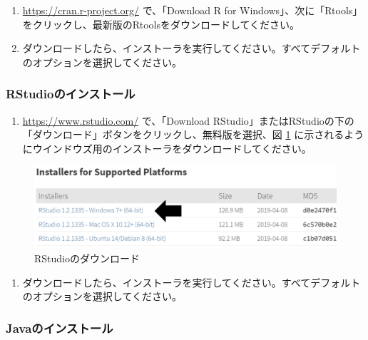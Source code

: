 \documentclass[
  11pt]{book}
\providecommand{\tightlist}{%
  \setlength{\itemsep}{0pt}\setlength{\parskip}{0pt}}
\theoremstyle{definition}
\theoremstyle{definition}
\theoremstyle{definition}
\theoremstyle{definition}
\theoremstyle{remark}
\begin{document}
\begin{enumerate}
\def\labelenumi{\arabic{enumi}.}
\item
  \url{https://cran.r-project.org/} で、「Download R for Windows」、次に「Rtools」をクリックし、最新版のRtoolsをダウンロードしてください。
\item
  ダウンロードしたら、インストーラを実行してください。すべてデフォルトのオプションを選択してください。
\end{enumerate}

\subsubsection*{RStudioのインストール}\label{rstudioux306eux30a4ux30f3ux30b9ux30c8ux30fcux30eb}

\begin{enumerate}
\def\labelenumi{\arabic{enumi}.}
\tightlist
\item
  \url{https://www.rstudio.com/} で、「Download RStudio」またはRStudioの下の「ダウンロード」ボタンをクリックし、無料版を選択、図 \ref{fig:downloadRStudio} に示されるようにウインドウズ用のインストーラをダウンロードしてください。
\end{enumerate}

\begin{figure}

{\centering \includegraphics[width=1\linewidth]{images/OhdsiAnalyticsTools/downloadRStudio} 

}

\caption{RStudioのダウンロード}\label{fig:downloadRStudio}
\end{figure}

\begin{enumerate}
\def\labelenumi{\arabic{enumi}.}
\setcounter{enumi}{1}
\tightlist
\item
  ダウンロードしたら、インストーラを実行してください。すべてデフォルトのオプションを選択してください。
\end{enumerate}

\subsubsection*{Javaのインストール}\label{javaux306eux30a4ux30f3ux30b9ux30c8ux30fcux30eb}
\end{document}
